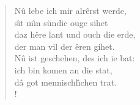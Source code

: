 \documentclass[11pt]{article}
\begin{document}
\newlength{\vcolwidth}
\setlength{\vcolwidth}{0.3\textwidth}

\newlength{\ssep}
\setlength{\ssep}{3ex}


\newenvironment{stanza}{
}{
}
\begin{verse}

\begin{multicols}{2}

%
%
\begin{stanza}
N\^u lebe ich mir alr\^erst werde, \\
s\^\i t m\^\i n s\"undic ouge sihet \\
daz h\^ere lant und ouch die erde, \\
der man vil der \^eren gihet.\\
N\^u ist geschehen, des ich ie bat:\\
ich bin komen an die stat,\\
d\^a got mennischl\^\i chen trat.\\!
\end{stanza}



\end{multicols}
\end{verse}
\end{document}
